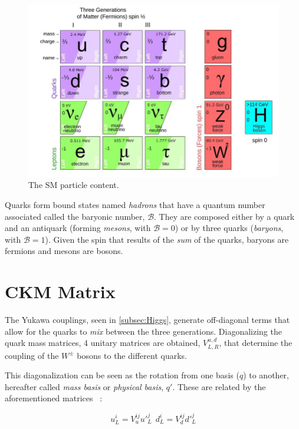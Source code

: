 \begin{figure} [htb!]
\begin{center}
\includegraphics[scale=0.5]{figs/particle_content.jpg}
\caption{The SM particle content. \label{fig:particle_content}}
\end{center}
\end{figure}

Quarks form bound states named \textit{hadrons} that have a quantum number associated called the baryonic number, $\mathcal{B}$. They are composed either by a quark and an antiquark (forming \textit{mesons}, with $\mathcal{B} = 0$) or by three quarks (\textit{baryons}, with $\mathcal{B}=1$). Given the spin that results of the \textit{sum} of the quarks, baryons are fermions and mesons are bosons. 

\section{CKM Matrix}
\label{sec:CKMMatrix} 
The Yukawa couplings, seen in \ref{subsec:Higgs}, generate off-diagonal terms that allow for the quarks to \textit{mix} between the three generations. Diagonalizing the quark mass matrices, 4 unitary matrices are obtained, $V_{L,R}^{u,d}$, that determine the coupling of the $W^{\pm}$ bosons to the different quarks. 

This diagonalization can be seen as the rotation from one basis ($q$) to another, hereafter called \textit{mass basis} or \textit{physical basis}, $q'$. These are related by the aforementioned matrices ~\cite{CKM}:

\begin{equation}
u_L^i = V_u^{ij} u'^{j}_L \ \ d_L^i = V_d^{ij}d'^{j}_L 
\end{equation}

